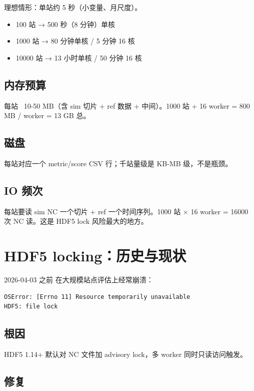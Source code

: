 理想情形：单站约 5 秒（小变量、月尺度）。

\begin{itemize}
  \item 100 站 → 500 秒（8 分钟）单核
  \item 1000 站 → 80 分钟单核 / 5 分钟 16 核
  \item 10000 站 → 13 小时单核 / 50 分钟 16 核
\end{itemize}

\subsection{内存预算}

每站 ~10-50 MB（含 sim 切片 + ref 数据 + 中间）。1000 站 + 16 worker = 800 MB / worker = 13 GB 总。

\subsection{磁盘}

每站对应一个 metric/score CSV 行；千站量级是 KB-MB 级，不是瓶颈。

\subsection{IO 频次}

每站要读 sim NC 一个切片 + ref 一个时间序列。1000 站 × 16 worker = 16000 次 NC 读。这是 HDF5 lock 风险最大的地方。

\section{HDF5 locking：历史与现状}

2026-04-03 之前 \openbench{} 在大规模站点评估上经常崩溃：

\begin{verbatim}
OSError: [Errno 11] Resource temporarily unavailable
HDF5: file lock
\end{verbatim}

\subsection{根因}

HDF5 1.14+ 默认对 NC 文件加 advisory lock，多 worker 同时只读访问触发。

\subsection{修复}

